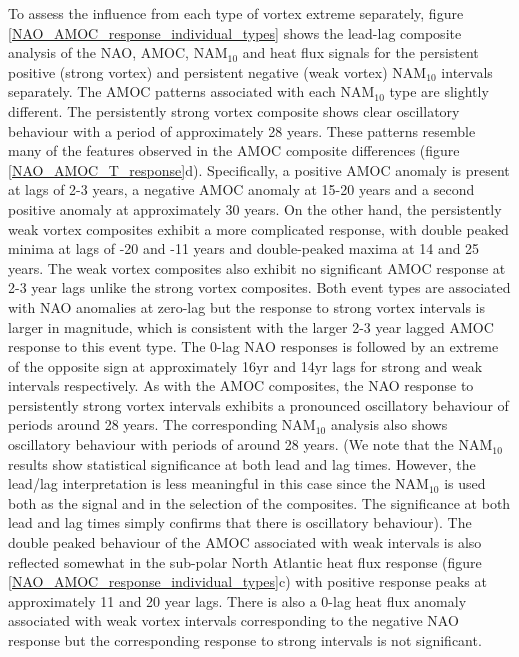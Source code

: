 To assess the influence from each type of vortex extreme separately, figure \ref{NAO_AMOC_response_individual_types} shows the lead-lag composite analysis of the NAO, AMOC, NAM$_{10}$ and heat flux signals for the persistent positive (strong vortex) and persistent negative (weak vortex) NAM$_{10}$ intervals separately. The AMOC patterns associated with each NAM$_{10}$ type are slightly different. The persistently strong vortex composite shows clear oscillatory behaviour with a period of approximately 28 years. These patterns resemble many of the features observed in the AMOC composite differences (figure \ref{NAO_AMOC_T_response}d). Specifically, a positive AMOC anomaly is present at lags of 2-3 years, a negative AMOC anomaly at 15-20 years and a second positive anomaly at approximately 30 years. On the other hand, the persistently weak vortex composites exhibit a more complicated response, with double peaked minima at lags of -20 and -11 years and double-peaked maxima at 14 and 25 years. The weak vortex composites also exhibit no significant AMOC response at 2-3 year lags unlike the strong vortex composites. Both event types are associated with NAO anomalies at zero-lag but the response to strong vortex intervals is larger in magnitude, which is consistent with the larger 2-3 year lagged AMOC response to this event type. The 0-lag NAO responses is followed by an extreme of the opposite sign at approximately 16yr and 14yr lags for strong and weak intervals respectively. As with the AMOC composites, the NAO response to persistently strong vortex intervals exhibits a pronounced oscillatory behaviour of periods around 28 years. The corresponding NAM$_{10}$ analysis also shows oscillatory behaviour with periods of around 28 years. (We note that the NAM$_{10}$ results  show statistical significance  at both lead and lag times. However, the lead/lag interpretation is less meaningful in this case since the NAM$_{10}$ is used both as the signal and in the selection of the composites. The significance at both lead and lag times simply confirms that there is oscillatory behaviour). The double peaked behaviour of the AMOC associated with weak intervals is also reflected somewhat in the sub-polar North Atlantic heat flux response (figure \ref{NAO_AMOC_response_individual_types}c) with positive response peaks at approximately 11 and 20 year lags. There is also a 0-lag heat flux anomaly associated with weak vortex intervals corresponding to the negative NAO response but the corresponding response to strong intervals is not significant. 

